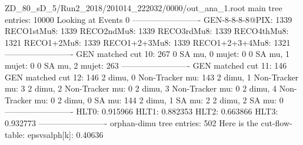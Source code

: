 ZD_80_sD_5/Run2_2018/201014_222032/0000/out_ana_1.root
main tree entries: 10000
Looking at Events 0
-------------------------
GEN-8-8-8-8@PIX: 1339
RECO1stMu8: 1339
RECO2ndMu8: 1339
RECO3rdMu8: 1339
RECO4thMu8: 1321
RECO1+2Mu8: 1339
RECO1+2+3Mu8: 1339
RECO1+2+3+4Mu8: 1321
-------------------------
GEN matched cut 10: 267
0 SA mu, 0 mujet: 0
0 SA mu, 1 mujet: 0
0 SA mu, 2 mujet: 263
-------------------------
GEN matched cut 11: 146
GEN matched cut 12: 146
2 dimu, 0 Non-Tracker mu: 143
2 dimu, 1 Non-Tracker mu: 3
2 dimu, 2 Non-Tracker mu: 0
2 dimu, 3 Non-Tracker mu: 0
2 dimu, 4 Non-Tracker mu: 0
2 dimu, 0 SA mu: 144
2 dimu, 1 SA mu: 2
2 dimu, 2 SA mu: 0
-------------------------
HLT0: 0.915966
HLT1: 0.882353
HLT2: 0.663866
HLT3: 0.932773
-------------------------
orphan-dimu tree entries: 502
Here is the cut-flow-table:
epsvsalph[k]: 0.40636
        

